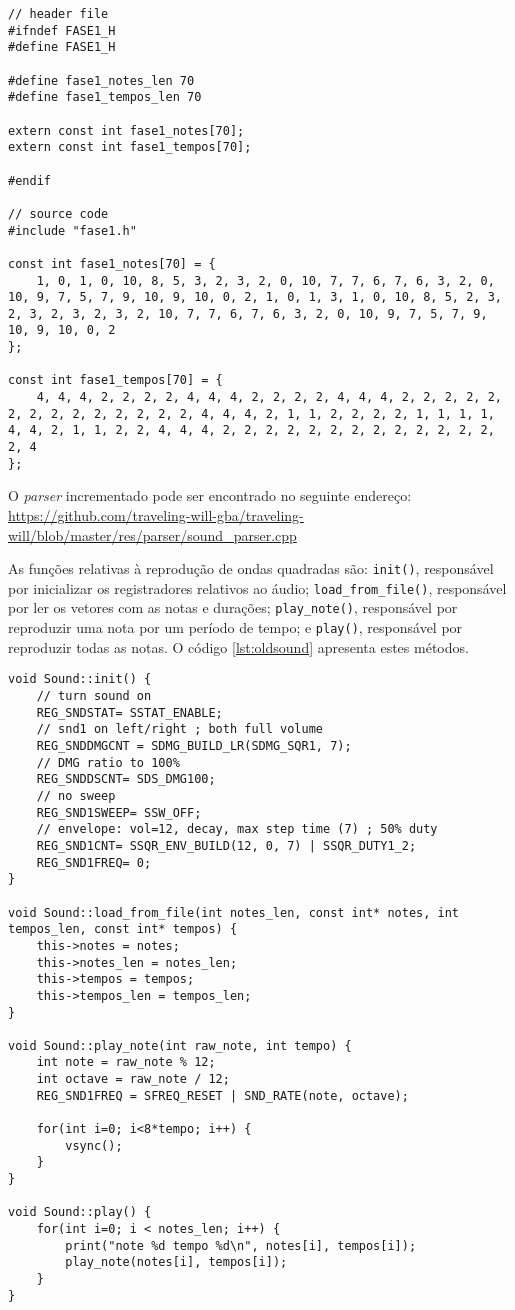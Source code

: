 \begin{lstlisting}[caption={Código gerado com notas e durações.},label={lst:notastempos}]
// header file
#ifndef FASE1_H
#define FASE1_H

#define fase1_notes_len 70
#define fase1_tempos_len 70

extern const int fase1_notes[70];
extern const int fase1_tempos[70];

#endif

// source code
#include "fase1.h"

const int fase1_notes[70] = {
	1, 0, 1, 0, 10, 8, 5, 3, 2, 3, 2, 0, 10, 7, 7, 6, 7, 6, 3, 2, 0, 10, 9, 7, 5, 7, 9, 10, 9, 10, 0, 2, 1, 0, 1, 3, 1, 0, 10, 8, 5, 2, 3, 2, 3, 2, 3, 2, 3, 2, 10, 7, 7, 6, 7, 6, 3, 2, 0, 10, 9, 7, 5, 7, 9, 10, 9, 10, 0, 2
};

const int fase1_tempos[70] = {
	4, 4, 4, 2, 2, 2, 2, 4, 4, 4, 2, 2, 2, 2, 4, 4, 4, 2, 2, 2, 2, 2, 2, 2, 2, 2, 2, 2, 2, 2, 2, 4, 4, 4, 2, 1, 1, 2, 2, 2, 2, 1, 1, 1, 1, 4, 4, 2, 1, 1, 2, 2, 4, 4, 4, 2, 2, 2, 2, 2, 2, 2, 2, 2, 2, 2, 2, 2, 2, 4
};
\end{lstlisting}

O \textit{parser} incrementado pode ser encontrado no seguinte endereço: \url{https://github.com/traveling-will-gba/traveling-will/blob/master/res/parser/sound_parser.cpp}

As funções relativas à reprodução de ondas quadradas são: \texttt{init()}, responsável por inicializar os registradores relativos ao áudio; \texttt{load\_from\_file()}, responsável por ler os vetores com as notas e durações; \texttt{play\_note()}, responsável por reproduzir uma nota por um período de tempo; e \texttt{play()}, responsável por reproduzir todas as notas. O código \ref{lst:oldsound} apresenta estes métodos.

\begin{lstlisting}[caption={Reprodução de notas e durações},label={lst:oldsound}]
void Sound::init() {
	// turn sound on
	REG_SNDSTAT= SSTAT_ENABLE;
	// snd1 on left/right ; both full volume
	REG_SNDDMGCNT = SDMG_BUILD_LR(SDMG_SQR1, 7);
	// DMG ratio to 100%
	REG_SNDDSCNT= SDS_DMG100;
	// no sweep
	REG_SND1SWEEP= SSW_OFF;
	// envelope: vol=12, decay, max step time (7) ; 50% duty
	REG_SND1CNT= SSQR_ENV_BUILD(12, 0, 7) | SSQR_DUTY1_2;
	REG_SND1FREQ= 0;
}

void Sound::load_from_file(int notes_len, const int* notes, int tempos_len, const int* tempos) {
    this->notes = notes;
    this->notes_len = notes_len;
    this->tempos = tempos;
    this->tempos_len = tempos_len;
}

void Sound::play_note(int raw_note, int tempo) {
	int note = raw_note % 12;
	int octave = raw_note / 12;
	REG_SND1FREQ = SFREQ_RESET | SND_RATE(note, octave);

	for(int i=0; i<8*tempo; i++) {
		vsync();
	}
}

void Sound::play() {
	for(int i=0; i < notes_len; i++) {
		print("note %d tempo %d\n", notes[i], tempos[i]);
		play_note(notes[i], tempos[i]);
	}
}
\end{lstlisting}



